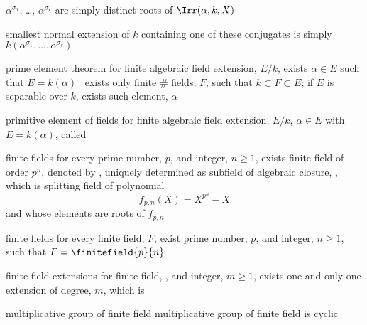 \documentclass[17pt,landscape]{foils}
\begin{document}
{\bit
\item
	$\alpha^{\sigma_1}$,
	\ldots,
	$\alpha^{\sigma_r}$
	are simply
	distinct roots of $\Irr(\alpha, k, X)$
\item
	smallest normal extension of $k$
	containing one of these conjugates
	is simply
	$k(\alpha^{\sigma_1}, \ldots, \alpha^{\sigma_r})$
\eit



\begin{mytheorem}{prime element theorem}
	for finite algebraic field extension, $E/k$,
	exists $\alpha\in E$ such that $E=k(\alpha)$
	\iaoi\
	exists only finite \# fields, $F$, such that $k\subset F\subset E$;
	if $E$ is separable over $k$,
	exists such element, $\alpha$\
\end{mytheorem}

\begin{mydefinition}{primitive element of fields}
	for finite algebraic field extension, $E/k$,
	$\alpha\in E$ with $E=k(\alpha)$,
	called 
\end{mydefinition}


\myfoilhead{Finite fields}

\begin{mydefinition}{finite fields}
	for every prime number, $p$, and integer, $n\geq1$,
	exists finite field of order $p^n$,
	denoted by \define{\finitefield{p}{n}},
	uniquely determined as subfield of algebraic closure, ,
	which is splitting field of polynomial
	$$
		f_{p,n}(X) = X^{p^n} - X
	$$
	and whose elements are roots of $f_{p,n}$
\end{mydefinition}

\begin{mytheorem}{finite fields}
	for every finite field, $F$,
	exist prime number, $p$, and integer, $n\geq1$,
	such that $F=\finitefield{p}{n}$
\end{mytheorem}

\begin{mycorollary}{finite field extensions}
	for finite field, , and integer, $m\geq1$,
	exists one and only one extension of degree, $m$,
	which is \finitefield{p}{mn}\
\end{mycorollary}

\begin{mytheorem}{multiplicative group of finite field}
	multiplicative group of finite field is cyclic\
\end{mytheorem}


}
\end{document}
